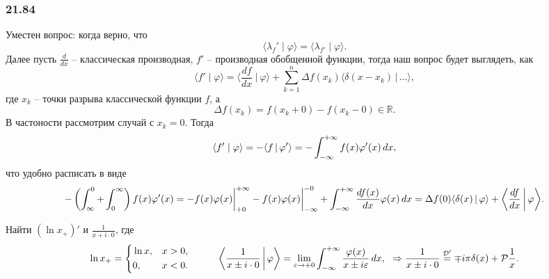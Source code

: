 \subsubsection*{21.84}

Уместен вопрос: когда верно, что
\begin{equation*}
    \langle \lambda_f' \mid \varphi\rangle = \langle  \lambda_{f'} \mid \varphi\rangle.
\end{equation*}
Далее пусть $\frac{d }{d x}$ -- классическая производная, $f'$ -- производная обобщенной функции, тогда наш вопрос будет выглядеть, как
\begin{equation*}
    \langle f' \mid \varphi \rangle = \bigg\langle 
        \frac{d f}{d x} \ \bigg|\ \varphi
    \bigg\rangle + \sum_{k=1}^{n} \Delta f(x_k) \langle \delta(x-x_k) \,|\, \ldots \rangle ,
\end{equation*}
где $x_k$ -- точки разрыва классической функции $f$, а
\begin{equation*}
    \Delta f (x_k) = f(x_k + 0) - f(x_k - 0) \in \mathbb{R}.
\end{equation*}
В частоности рассмотрим  случай с $x_k = 0$. Тогда
\begin{equation*}
    \langle f' \mid \varphi \rangle = - \langle f \,|\, \varphi' \rangle = - \int_{-\infty}^{+\infty} f(x) \varphi'(x) \, d x,
\end{equation*}
что удобно расписать в виде
\begin{equation*}
    - \left(\int_{\infty}^{0} + \int_0^\infty\right) f(x) \varphi'(x) = 
    - f(x) \varphi(x) \bigg|_{+0}^{+\infty} - f(x) \varphi(x) \bigg|_{-\infty}^{-0} + 
    \int_{-\infty}^{+\infty} \frac{d f(x)}{d x} \varphi(x) \, d x =  \Delta f(0) \langle \delta(x) \,|\, \varphi \rangle + \bigg\langle \frac{d f}{d x}  \,\bigg|\, \varphi  \bigg\rangle.
\end{equation*}



\begin{hw1}
    Найти $(\ln x_+)'$ и $\frac{1}{x + i \cdot 0}$, где 
    \begin{equation*}
        \ln x_+ = \left\{\begin{aligned}
            &\ln x, &x > 0, \\
            &0, &x < 0.
        \end{aligned}\right.
        \hspace{10 mm} 
        \bigg\langle \frac{1}{x \pm i \cdot 0} \,\bigg|\, \varphi \bigg\rangle  = \lim_{\varepsilon \to +0} \int_{-\infty}^{+\infty}  \frac{\varphi(x)}{x \pm i \varepsilon} \d x,
        \ \ \Rightarrow 
        \frac{1}{x \pm i \cdot 0} \overset{\mathcal D'}{=}  \mp i \pi \delta(x) + \mathcal P \frac{1}{x}.
    \end{equation*}
\end{hw1}



